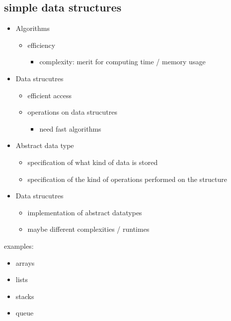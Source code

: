 \documentclass[a4paper]{article}
\begin{document}
\subsection{simple data structures}
\begin{itemize}
    \item Algorithms
        \begin{itemize}
            \item efficiency
                \begin{itemize}
                    \item complexity:
                        merit for computing time / memory usage
                \end{itemize}
        \end{itemize}
    \item Data strucutres
        \begin{itemize}
            \item efficient access
            \item operations on data strucutres
                \begin{itemize}
                    \item need fast algorithms
                \end{itemize}
        \end{itemize}
    \item Abstract data type
        \begin{itemize}
            \item specification of what kind of data is stored
            \item specification of the kind of operations performed on the structure
        \end{itemize}
    \item Data strucutres
        \begin{itemize}
            \item implementation of abstract datatypes
            \item maybe different complexities / runtimes
        \end{itemize}
\end{itemize}
examples:
\begin{itemize}
    \item arrays
    \item lists
    \item stacks
    \item queue
\end{itemize}
\end{document}

